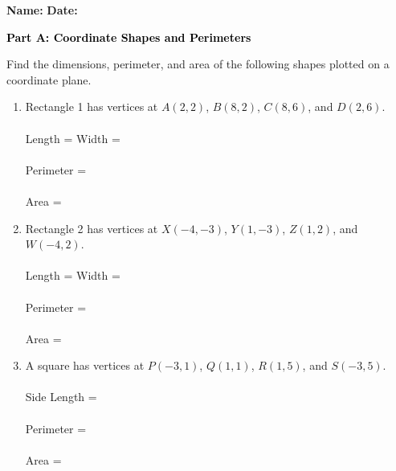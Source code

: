 \documentclass[12pt, letterpaper, fleqn]{article}
\newcommand{\blank}{\underline{\hspace{2.2cm}}}
\newcommand{\blanklong}{\underline{\hspace{6.5cm}}}
\begin{document}
\textbf{Name:} \underline{\hspace{5cm}}
\hfill
\textbf{Date:} \underline{\hspace{3cm}}\\

\begin{tcolorbox}[colback=black!10]
    \large\textcolor{black}{\textbf{Part A: Coordinate Shapes and Perimeters}}
\end{tcolorbox}

\vspace{3mm}

\noindent
Find the dimensions, perimeter, and area of the following shapes plotted on a coordinate plane.

\vspace{5mm}

\begin{enumerate}[itemsep=2cm, leftmargin=0.6cm]
\item Rectangle 1 has vertices at $A(2, 2)$, $B(8, 2)$, $C(8, 6)$, and $D(2, 6)$. \\ \\
Length = \blank \quad Width = \blank \\ \\
Perimeter = \blanklong \quad \\ \\ Area = \blanklong

\item Rectangle 2 has vertices at $X(-4, -3)$, $Y(1, -3)$, $Z(1, 2)$, and $W(-4, 2)$. \\ \\
Length = \blank \quad Width = \blank \\ \\
Perimeter = \blanklong \quad \\ \\ Area = \blanklong

\item A square has vertices at $P(-3, 1)$, $Q(1, 1)$, $R(1, 5)$, and $S(-3, 5)$. \\ \\
Side Length = \blank \\ \\
Perimeter = \blanklong \quad \\ \\ Area = \blanklong
\end{enumerate}
\end{document}
